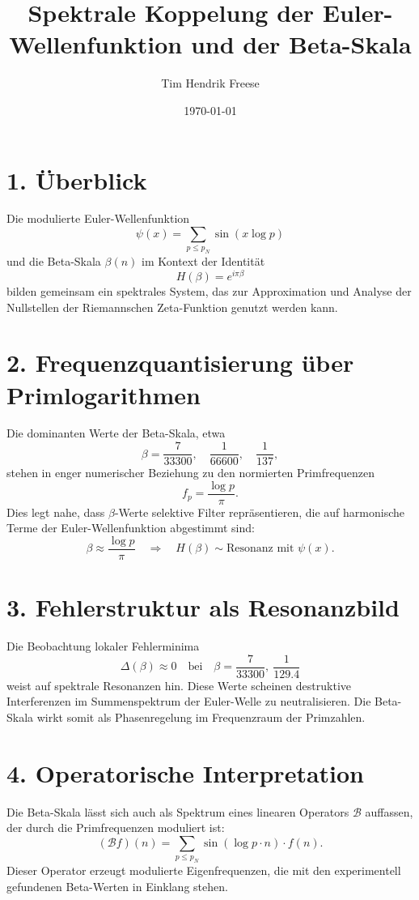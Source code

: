 \documentclass[12pt]{article}
\title{Spektrale Koppelung der Euler-Wellenfunktion und der Beta-Skala}
\author{Tim Hendrik Freese}
\date{\today}
\begin{document}
\maketitle

\section*{1. Überblick}

Die modulierte Euler-Wellenfunktion
\[
\psi(x) = \sum_{p \leq p_N} \sin(x \log p)
\]
und die Beta-Skala \( \beta(n) \) im Kontext der Identität
\[
H(\beta) = e^{i\pi\beta}
\]
bilden gemeinsam ein spektrales System, das zur Approximation und Analyse der Nullstellen der Riemannschen Zeta-Funktion genutzt werden kann.

\vspace{1em}

\section*{2. Frequenzquantisierung über Primlogarithmen}

Die dominanten Werte der Beta-Skala, etwa
\[
\beta = \frac{7}{33300},\quad \frac{1}{66600},\quad \frac{1}{137},
\]
stehen in enger numerischer Beziehung zu den normierten Primfrequenzen
\[
f_p = \frac{\log p}{\pi}.
\]
Dies legt nahe, dass \(\beta\)-Werte selektive Filter repräsentieren, die auf harmonische Terme der Euler-Wellenfunktion abgestimmt sind:
\[
\beta \approx \frac{\log p}{\pi} \quad \Rightarrow \quad H(\beta) \sim \text{Resonanz mit } \psi(x).
\]

\section*{3. Fehlerstruktur als Resonanzbild}

Die Beobachtung lokaler Fehlerminima
\[
\Delta(\beta) \approx 0 \quad \text{bei} \quad \beta = \frac{7}{33300},\ \frac{1}{129.4}
\]
weist auf spektrale Resonanzen hin. Diese Werte scheinen destruktive Interferenzen im Summenspektrum der Euler-Welle zu neutralisieren. Die Beta-Skala wirkt somit als Phasenregelung im Frequenzraum der Primzahlen.

\section*{4. Operatorische Interpretation}

Die Beta-Skala lässt sich auch als Spektrum eines linearen Operators \(\mathcal{B}\) auffassen, der durch die Primfrequenzen moduliert ist:
\[
(\mathcal{B} f)(n) = \sum_{p \leq p_N} \sin(\log p \cdot n) \cdot f(n).
\]
Dieser Operator erzeugt modulierte Eigenfrequenzen, die mit den experimentell gefundenen Beta-Werten in Einklang stehen.
\end{document}
